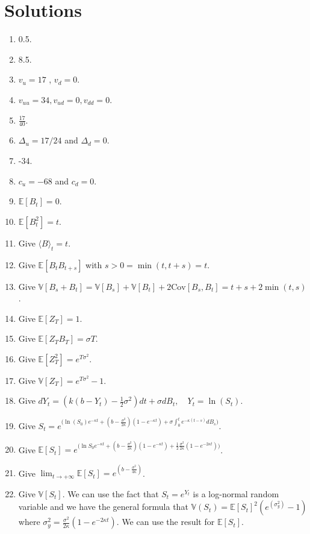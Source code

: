 \documentclass[article,11pt]{amsart}
\numberwithin{equation}{section}
\newcommand{\1}{{\bf 1}}
\begin{document}
\section*{Solutions}
\begin{enumerate}[label=Q\arabic*., start=1]
    \item 0.5.
    \item 8.5.
    \item $v_u=17$ , $v_d=0$.
    \item $v_{uu}=34, v_{ud}=0, v_{dd} =0$.
    \item $\frac{17}{40}$.
    \item $\Delta_u=17/24$ and $\Delta_d=0$.
    \item -34.
    \item $c_u=-68$ and $c_d = 0$.
    \item $\mathbb{E}[B_t] = 0$.
    \item $\mathbb{E}[B_t^2]=t$.
    \item Give $\langle B \rangle_t = t$.
    \item Give $\mathbb{E}[B_t B_{t+s}]$ with $s > 0 = \min(t,t+s)=t$.
    \item Give $\mathbb{V}[B_s + B_t] = \mathbb{V}[B_s] + \mathbb{V}[B_t] + 2 \text{Cov}[B_s,B_t]= t + s + 2\min(t,s) $.
    \item Give $\mathbb{E}[Z_T] = 1$.
    \item Give $\mathbb{E}[Z_T B_T]=\sigma T$.
    \item Give $\mathbb{E}[Z_T^2]=e^{T \sigma^2}$.
    \item Give $\mathbb{V}[Z_T]=e^{T \sigma^2}-1$.
    \item Give $dY_t=(k(b-Y_t) - \frac{1}{2}\sigma^2)dt + \sigma dB_t, \quad Y_t = \ln(S_t)$.
    \item Give $S_t = e^{ \bigg( \ln(S_0)e^{-\kappa t} + (b-\frac{\sigma^2}{2\kappa})(1-e^{-\kappa t}) + \sigma \int_0^t e^{-\kappa (t-s)}dB_s \bigg)}$.
    \item Give $\mathbb{E}[S_t]= e^{ \bigg(  \ln S_0  e^{-\kappa t} + (b-\frac{\sigma^2}{2\kappa})(1-e^{-\kappa t}) + \frac{1}{2} \frac{\sigma^2}{2\kappa}(1-e^{-2\kappa t}) \bigg)}$.
    \item Give $\lim_{t \to +\infty} \mathbb{E}[S_t] = e^{(b - \frac{\sigma^2}{4\kappa})}$.
    \item Give $\mathbb{V}[S_t]$. We can use the fact that $S_t=e^{Y_t}$ is a log-normal random variable and we have the general formula that $\mathbb{V}(S_t)=\mathbb{E}[S_t]^2(e^{(\sigma_y^2)}-1)$ where $\sigma_y^2= \frac{\sigma^2}{2 \kappa}(1-e^{ -2 \kappa t})$. We can use the result for $\mathbb{E}[S_t]$.

\end{enumerate}
\end{document}
